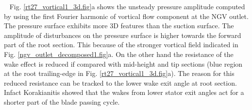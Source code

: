 ~\newline
 Fig. \ref{rt27_vortical1_3d.fig}a shows the unsteady pressure
 amplitude computed by using the first Fourier harmonic of
 vortical flow component at the NGV outlet.
 The pressure surface exhibits more 3D features
 than the suction surface.
 The amplitude of disturbances on the pressure surface is higher
 towards the forward part of the root section. This because of
 the stronger vortical field indicated in
 Fig. \ref{ngv_outlet_decomposed1.fig}a. On the other hand the
 resistance of the wake effect is reduced if compared with mid-height
 and tip sections (blue region at the root trailing-edge
 in Fig. \ref{rt27_vortical1_3d.fig}a). The reason for this reduced resistance
 can be tracked to the lower wake exit angle at root section.
 Infact Korakianitis \citeyear{Kora:3} showed that the wakes
 from lower stator exit angles act for a shorter part of the blade passing cycle.
%
%
